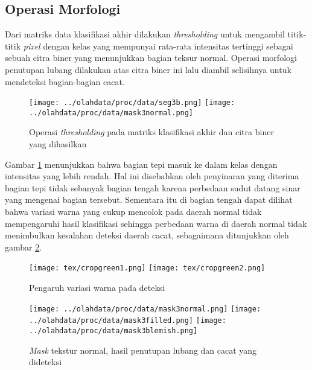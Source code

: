 \documentclass[laporan.tex]{subfiles}
\begin{document}
\subsection{Operasi Morfologi}

Dari matriks data klasifikasi akhir dilakukan \emph{thresholding} untuk mengambil titik-titik \emph{pixel} dengan kelas yang mempunyai rata-rata intensitas tertinggi sebagai sebuah citra biner yang menunjukkan bagian teksur normal. Operasi morfologi penutupan lubang dilakukan atas citra biner ini lalu diambil selisihnya untuk mendeteksi bagian-bagian cacat.

\begin{figure}[h!]
\centering
\texttt{[image: ../olahdata/proc/data/seg3b.png]} \qquad
\texttt{[image: ../olahdata/proc/data/mask3normal.png]}
\caption{Operasi \emph{thresholding} pada matriks klasifikasi akhir dan citra biner yang dihasilkan}
\label{fig:finclassthresh}
\end{figure}

Gambar \ref{fig:finclassthresh} menunjukkan bahwa bagian tepi masuk ke dalam kelas dengan intensitas yang lebih rendah. Hal ini disebabkan oleh penyinaran yang diterima bagian tepi tidak sebanyak bagian tengah karena perbedaan sudut datang sinar yang mengenai bagian tersebut. Sementara itu di bagian tengah dapat dilihat bahwa variasi warna yang cukup mencolok pada daerah normal tidak mempengaruhi hasil klasifikasi sehingga perbedaan warna di daerah normal tidak menimbulkan kesalahan deteksi daerah cacat, sebagaimana ditunjukkan oleh gambar \ref{fig:greenyellow}.%

\begin{figure}[h!]
\centering
\texttt{[image: tex/cropgreen1.png]} \qquad
\texttt{[image: tex/cropgreen2.png]}
\caption{Pengaruh variasi warna pada deteksi}
\label{fig:greenyellow}
\end{figure}

\begin{figure}[h!]
\centering
\texttt{[image: ../olahdata/proc/data/mask3normal.png]} \qquad
\texttt{[image: ../olahdata/proc/data/mask3filled.png]} \qquad
\texttt{[image: ../olahdata/proc/data/mask3blemish.png]}
\caption{\emph{Mask} tekstur normal, hasil penutupan lubang dan cacat yang dideteksi}
\end{figure}

\end{document}
